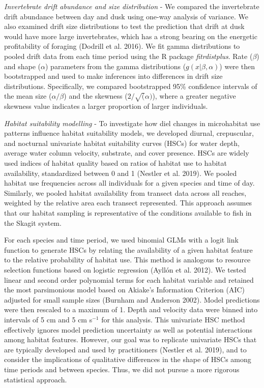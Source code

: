 \documentclass[]{article}
\begin{document}
\emph{Invertebrate drift abundance and size distribution} - We compared
the invertebrate drift abundance between day and dusk using one-way
analysis of variance. We also examined drift size distributions to test
the prediction that drift at dusk would have more large invertebrates,
which has a strong bearing on the energetic profitability of foraging
(Dodrill et al. 2016). We fit gamma distributions to pooled drift data
from each time period using the R package \emph{fitrdistplus}. Rate
(\(\beta\)) and shape (\(\alpha\)) parameters from the gamma
distributions (\(g(x|\beta,\alpha)\)) were then bootstrapped and used to
make inferences into differences in drift size distributions.
Specifically, we compared bootstrapped 95\% confidence intervals of the
mean size (\(\alpha/\beta\)) and the skewness (\(2/\sqrt(\alpha)\)),
where a greater negative skewness value indicates a larger proportion of
larger individuals.

\emph{Habitat suitability modelling} - To investigate how diel changes
in microhabitat use patterns influence habitat suitability models, we
developed diurnal, crepuscular, and nocturnal univariate habitat
suitability curves (HSCs) for water depth, average water column
velocity, substrate, and cover presence. HSCs are widely used indices of
habitat quality based on ratios of habitat use to habitat availability,
standardized between 0 and 1 (Nestler et al. 2019). We pooled habitat
use frequencies across all individuals for a given species and time of
day. Similarly, we pooled habitat availability from transect data across
all reaches, weighted by the relative area each transect represented.
This approach assumes that our habitat sampling is representative of the
conditions available to fish in the Skagit system.

For each species and time period, we used binomial GLMs with a logit
link function to generate HSCs by relating the availability of a given
habitat feature to the relative probability of habitat use. This method
is analogous to resource selection functions based on logistic
regression (Ayllón et al. 2012). We tested linear and second order
polynomial terms for each habitat variable and retained the most
parsimonious model based on Akiake's Information Criterion (AIC)
adjusted for small sample sizes (Burnham and Anderson 2002). Model
predictions were then rescaled to a maximum of 1. Depth and velocity
data were binned into intervals of 5 cm and 5 cm s\(^{-1}\) for this
analysis. This univariate HSC method effectively ignores model
prediction uncertainty as well as potential interactions among habitat
features. However, our goal was to replicate univariate HSCs that are
typically developed and used by practitioners (Nestler et al. 2019), and
to consider the implications of qualitative differences in the shape of
HSCs among time periods and between species. Thus, we did not pursue a
more rigorous statistical approach.
\end{document}
